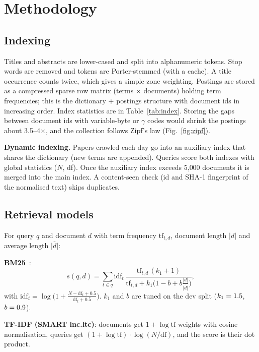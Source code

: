 \documentclass[10pt,twocolumn]{article}
\begin{document}
\section{Methodology}
\subsection{Indexing}
Titles and abstracts are lower-cased and split into alphanumeric tokens. Stop words
are removed and tokens are Porter-stemmed (with a cache). A title occurrence counts
twice, which gives a simple zone weighting. Postings are stored as a compressed
sparse row matrix (terms $\times$ documents) holding term frequencies; this is the
dictionary + postings structure with document ids in increasing order. Index
statistics are in Table~\ref{tab:index}. Storing the gaps between document ids with
variable-byte or $\gamma$ codes would shrink the postings about 3.5--4$\times$, and
the collection follows Zipf's law (Fig.~\ref{fig:zipf}).

\textbf{Dynamic indexing.} Papers crawled each day go into an auxiliary index that
shares the dictionary (new terms are appended). Queries score both indexes with
global statistics ($N$, df). Once the auxiliary index exceeds 5{,}000 documents it
is merged into the main index. A content-seen check (id and SHA-1 fingerprint of the
normalised text) skips duplicates.

\begin{table}[t]
\centering\small
\caption{Inverted index statistics.}
\label{tab:index}

\end{table}

\subsection{Retrieval models}
For query $q$ and document $d$ with term frequency $\mathrm{tf}_{t,d}$, document length
$|d|$ and average length $\overline{|d|}$:

\textbf{BM25}~\cite{robertson2009}:
\begin{equation}
s(q,d)=\sum_{t\in q} \mathrm{idf}_t\,\frac{\mathrm{tf}_{t,d}\,(k_1+1)}{\mathrm{tf}_{t,d}+k_1\big(1-b+b\frac{|d|}{\overline{|d|}}\big)},
\end{equation}
with $\mathrm{idf}_t=\log\big(1+\frac{N-\mathrm{df}_t+0.5}{\mathrm{df}_t+0.5}\big)$.
$k_1$ and $b$ are tuned on the dev split ($k_1=1.5$, $b=0.9$).

\textbf{TF-IDF (SMART lnc.ltc)}: documents get $1+\log\mathrm{tf}$ weights with cosine
normalisation, queries get $(1+\log\mathrm{tf})\cdot\log(N/\mathrm{df})$, and the score is
their dot product.
\end{document}
